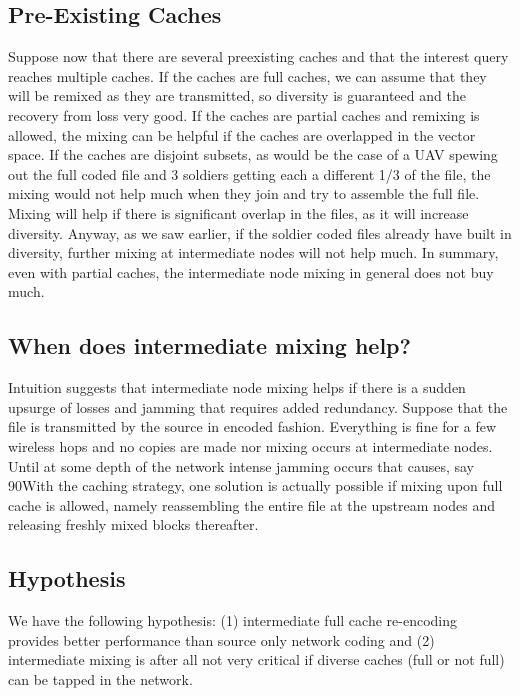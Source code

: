 \subsection{Pre-Existing Caches}
	 	 	
Suppose now that there are several preexisting caches and that the interest query reaches multiple caches. If the caches are full caches, we can assume that they will be remixed as they are transmitted, so diversity is guaranteed and the recovery from loss very good. If the caches are partial caches and remixing is allowed, the mixing can be helpful if the caches are overlapped in the vector space. If the caches are disjoint subsets, as would be the case of a UAV spewing out the full coded file and 3 soldiers getting each a different 1/3 of the file, the mixing would not help much when they join and try to assemble the full file. Mixing will help if there is significant overlap in the files, as it will increase diversity. Anyway, as we saw earlier, if the soldier coded files already have built in diversity, further mixing at intermediate nodes will not help much. In summary, even with partial caches, the intermediate node mixing in general does not buy much.


\subsection{When does intermediate mixing help?}
	 	 	
Intuition suggests that intermediate node mixing helps if there is a sudden upsurge of losses and jamming that requires added redundancy. Suppose that the file is transmitted by the source in encoded fashion. Everything is fine for a few wireless hops and no copies are made nor mixing occurs at intermediate nodes. Until at some depth of the network intense jamming occurs that causes, say 90With the caching strategy, one solution is actually possible if mixing upon full cache is allowed, namely reassembling the entire file at the upstream nodes and releasing freshly mixed blocks thereafter.  

\subsection{Hypothesis}

We have the following hypothesis: (1) intermediate full cache re-encoding provides better performance than source only network coding and (2) intermediate mixing is after all not very critical if diverse caches (full or not full) can be tapped in the network.

